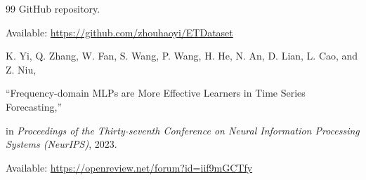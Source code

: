 \documentclass[conference]{IEEEtran}
\begin{document}
\begin{thebibliography}{99}
GitHub repository.

Available: \url{https://github.com/zhouhaoyi/ETDataset}



K. Yi, Q. Zhang, W. Fan, S. Wang, P. Wang, H. He, N. An, D. Lian, L. Cao, and Z. Niu,

``Frequency-domain MLPs are More Effective Learners in Time Series Forecasting,''

in \textit{Proceedings of the Thirty-seventh Conference on Neural Information Processing Systems (NeurIPS)}, 2023.

Available: \url{https://openreview.net/forum?id=iif9mGCTfy}

\end{thebibliography}
\end{document}
